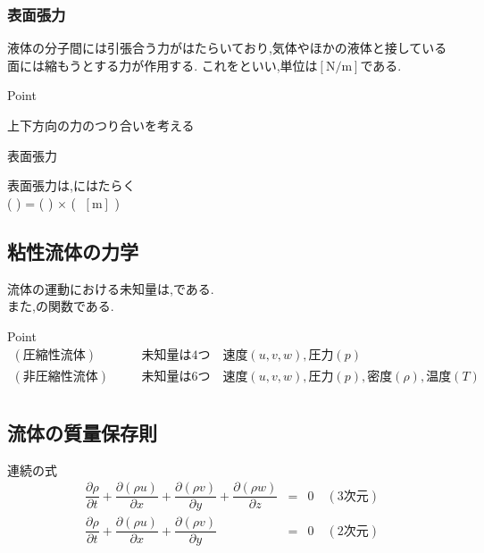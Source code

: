 \documentclass[a4paper]{jsarticle}
\begin{document}
\subsubsection{表面張力}
液体の分子間には引張合う力がはたらいており,気体やほかの液体と接している面には縮もうとする力が作用する.
これをといい,単位は$\left[\mathrm{N/m}\right]$である.
\begin{itembox}[l]{Point}
    \begin{center}
        上下方向の力のつり合いを考える\\
    \end{center}
\end{itembox}
\begin{itembox}[l]{表面張力}
    \begin{center}
        表面張力は,にはたらく\\
        (  ) = ( ) $\times$ ( $\;\left[\mathrm{m}\right]$ )
    \end{center}
\end{itembox}
\subsection{粘性流体の力学}
流体の運動における未知量は,である.\\
また,の関数である.\\
\begin{itembox}[l]{Point}
    \begin{eqnarray*}
        (圧縮性流体)&&\quad 未知量は4つ\quad 速度\left(u,v,w\right),圧力\left(p\right)\\
        (非圧縮性流体)&&\quad 未知量は6つ\quad 速度\left(u,v,w\right),圧力\left(p\right),密度\left(\rho\right),温度\left(T\right)\\
    \end{eqnarray*}
\end{itembox}
\subsection{流体の質量保存則}
\begin{itembox}[l]{連続の式}
    \begin{eqnarray*}
        \dfrac{\partial\rho}{\partial t}+\dfrac{\partial \left(\rho u\right)}{\partial x}+\dfrac{\partial \left(\rho v\right)}{\partial y}+\dfrac{\partial \left(\rho w\right)}{\partial z}&=&0\quad(3次元)\\
        \dfrac{\partial\rho}{\partial t}+\dfrac{\partial \left(\rho u\right)}{\partial x}+\dfrac{\partial \left(\rho v\right)}{\partial y}&=&0\quad(2次元)\\
    \end{eqnarray*}
\end{itembox}
\end{document}
